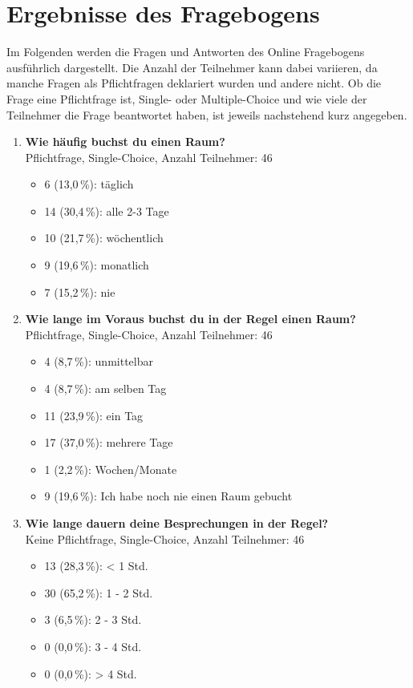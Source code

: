 \section{Ergebnisse des Fragebogens}
\label{sec:anhang-fragebogen}

Im Folgenden werden die Fragen und Antworten des Online Fragebogens ausführlich dargestellt. Die Anzahl der Teilnehmer kann dabei variieren, da manche Fragen als Pflichtfragen deklariert wurden und andere nicht. Ob die Frage eine Pflichtfrage ist, Single- oder Multiple-Choice und wie viele der Teilnehmer die Frage beantwortet haben, ist jeweils nachstehend kurz angegeben.

\begin{enumerate}
    \item \textbf{Wie häufig buchst du einen Raum?} \\
    Pflichtfrage, Single-Choice, Anzahl Teilnehmer: 46
    \begin{itemize}
        \item[] 6 (13,0\,\%): täglich
        \item[] 14 (30,4\,\%): alle 2-3 Tage
        \item[] 10 (21,7\,\%): wöchentlich
        \item[] 9 (19,6\,\%): monatlich
        \item[] 7 (15,2\,\%): nie
    \end{itemize}
    
    \item \textbf{Wie lange im Voraus buchst du in der Regel einen Raum?} \\ 
    Pflichtfrage, Single-Choice, Anzahl Teilnehmer: 46
    \begin{itemize}
        \item[] 4 (8,7\,\%): unmittelbar
        \item[] 4 (8,7\,\%): am selben Tag
        \item[] 11 (23,9\,\%): ein Tag
        \item[] 17 (37,0\,\%): mehrere Tage
        \item[] 1 (2,2\,\%): Wochen/Monate
        \item[] 9 (19,6\,\%): Ich habe noch nie einen Raum gebucht
    \end{itemize}
    
    \item \textbf{Wie lange dauern deine Besprechungen in der Regel?} \\ 
    Keine Pflichtfrage, Single-Choice, Anzahl Teilnehmer: 46
    \begin{itemize}
        \item[] 13 (28,3\,\%): < 1 Std.
        \item[] 30 (65,2\,\%): 1 - 2 Std.
        \item[] 3 (6,5\,\%): 2 - 3 Std.
        \item[] 0 (0,0\,\%): 3 - 4 Std.
        \item[] 0 (0,0\,\%): > 4 Std.
    \end{itemize}
    

\end{enumerate}
